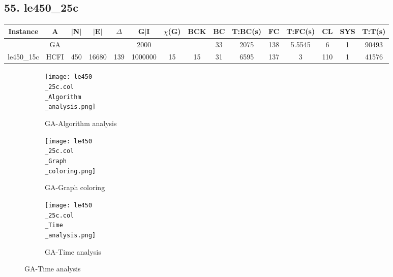 \documentclass[10pt]{article}
\begin{document}
\subsection*{\hspace{0,9073976cm} 55. le450\_25c }
\begin{table}[H]
\centering
\begin{tabular}{|c|c|c|c|c|c|c|c|c|c|c|c|c|c|c|}
\hline
Instance& A &$|$N$|$ & $|$E$|$ & $\Delta$ & G$|$I & $\chi$(G) &BCK&BC & T:BC(s) & FC & T:FC(s) & CL & SYS & T:T(s) \\ \hline \hline

	&GA&       &                   &                     &   2000      &     \cellcolor{yellow} & {\cellcolor{yellow}}& {{\cellcolor{green}33}}
&2075   & 138        &5.5545                   &6                    &  1        &90493        \\ \cline{2-2} \cline{6-6} \cline{9-15}
 \multirow{-2}{*}{le450\_15c} &HCFI   &\multirow{-2}{*}{450}   &\multirow{-2}{*}{16680}     &\multirow{-2}{*}{139}     &1000000     &\multirow{-2}{*}{\cellcolor{yellow}15}      & \multirow{-2}{*}{\cellcolor{yellow}15}    &{\cellcolor{green}31}     &6595         &137    &3         &110    &1     & 41576       \\ \hline 
\end{tabular}
\end{table}
\graphicspath{{./Core1/Solutions/GA/le450\_25c.col}}
\begin{figure}[H]
\begin{subfigure}{.33\textwidth}
  \centering
  \texttt{[image: le450\\\_25c.col\\\_Algorithm\\\_analysis.png]}
  \caption{GA-Algorithm analysis}
   \label{fig:subfig1}
\end{subfigure}%
\begin{subfigure}{.33\textwidth}
  \centering
  \texttt{[image: le450\\\_25c.col\\\_Graph\\\_coloring.png]}
  \caption{GA-Graph coloring}
  \label{fig:subfig2}
\end{subfigure}
\begin{subfigure}{.33\textwidth}
  \centering
  \texttt{[image: le450\\\_25c.col\\\_Time\\\_analysis.png]}
  \caption{GA-Time analysis}
  \end{subfigure}
\end{figure}
\end{document}
